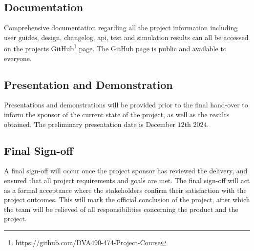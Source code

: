 
\subsection{Documentation}

Comprehensive documentation regarding all the project information including user guides, design, changelog, \ac{api}, test and simulation results can all be accessed on the projects \href{https://github.com/DVA490-474-Project-Course}{GitHub}\footnote{https://github.com/DVA490-474-Project-Course} page. The GitHub page is public and available to everyone.



\subsection{Presentation and Demonstration}

Presentations and demonstrations will be provided prior to the final hand-over to inform the sponsor of the current state of the project, as well as the results obtained. The preliminary presentation date is December $12\text{th}$ $2024$.



\subsection{Final Sign-off}

A final sign-off will occur once the project sponsor has reviewed the delivery, and ensured that all project requirements and goals are met.
The final sign-off will act as a formal acceptance where the stakeholders confirm their satisfaction with the project outcomes. This will mark the official conclusion of the project, after which the team will be relieved of all responsibilities concerning the product and the project.

